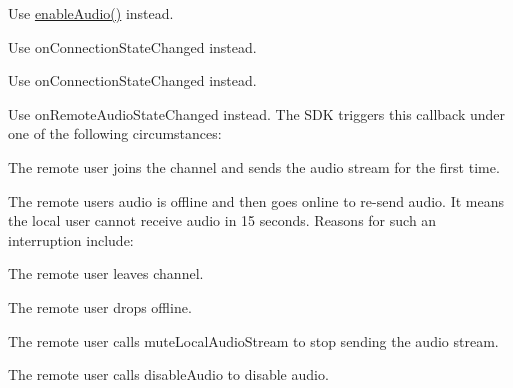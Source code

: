 
\begin{DoxyRefList}
\item[Member \mbox{\hyperlink{classagora_1_1rtc_1_1_i_rtc_engine_a566a23231286f5286fdb137966093e9f}{agora\+::rtc\+::I\+Rtc\+Engine\+::resume\+Audio}} () \+\_\+\+\_\+deprecated=0]\label{deprecated__deprecated000028}%
%
Use \mbox{\hyperlink{classagora_1_1rtc_1_1_i_rtc_engine_a996401c7ba33c6ec59527c5d109f548f}{enable\+Audio()}} instead. 
\item[Member \mbox{\hyperlink{classagora_1_1rtc_1_1_i_rtc_engine_event_handler_ac5d532fe92a0d6c424e87e694225b6e9}{agora\+::rtc\+::I\+Rtc\+Engine\+Event\+Handler\+::on\+Connection\+Interrupted}} () \+\_\+\+\_\+deprecated]\label{deprecated__deprecated000020}%
%
Use {\ttfamily on\+Connection\+State\+Changed} instead. 
\item[Member \mbox{\hyperlink{classagora_1_1rtc_1_1_i_rtc_engine_event_handler_a96abb5e2fef0afc0a80e87388ebdaa5e}{agora\+::rtc\+::I\+Rtc\+Engine\+Event\+Handler\+::on\+Connection\+Banned}} () \+\_\+\+\_\+deprecated]\label{deprecated__deprecated000021}%
%
Use {\ttfamily on\+Connection\+State\+Changed} instead.  
\item[Member \mbox{\hyperlink{classagora_1_1rtc_1_1_i_rtc_engine_event_handler_a599399089441b7daa560e9c410e8a7ba}{agora\+::rtc\+::I\+Rtc\+Engine\+Event\+Handler\+::on\+First\+Remote\+Audio\+Decoded}} (uid\+\_\+t uid, int elapsed) \+\_\+\+\_\+deprecated]\label{deprecated__deprecated000022}%
%
Use {\ttfamily on\+Remote\+Audio\+State\+Changed} instead. The S\+DK triggers this callback under one of the following circumstances\+:
\begin{DoxyItemize}
\item The remote user joins the channel and sends the audio stream for the first time.
\item The remote user\textquotesingle{}s audio is offline and then goes online to re-\/send audio. It means the local user cannot receive audio in 15 seconds. Reasons for such an interruption include\+:
\begin{DoxyItemize}
\item The remote user leaves channel.
\item The remote user drops offline.
\item The remote user calls mute\+Local\+Audio\+Stream to stop sending the audio stream.
\item The remote user calls disable\+Audio to disable audio.  

\end{DoxyItemize}
\end{DoxyItemize}
\end{DoxyRefList}
